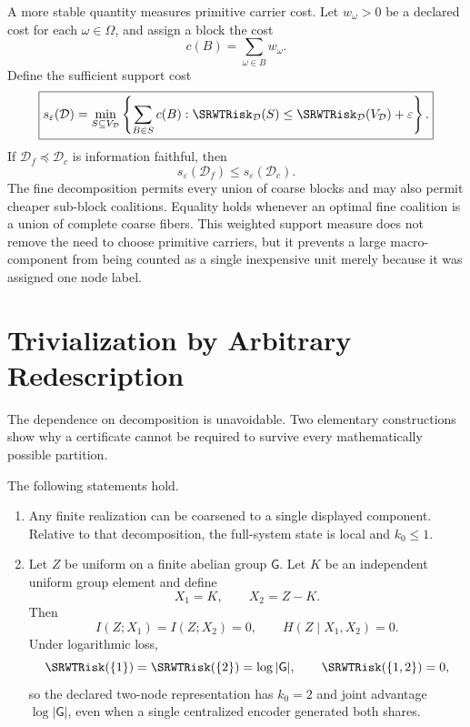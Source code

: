 A more stable quantity measures primitive carrier cost. Let
\(w_\omega>0\) be a declared cost for each \(\omega\in\Omega\), and assign a
block the cost
\[
c(B)=\sum_{\omega\in B}w_\omega.
\]
Define the sufficient support cost
\[
\boxed{
s_\varepsilon(\mathcal D)
=
\min_{S\subseteq V_{\mathcal D}}
\left\{
\sum_{B\in S}c(B):
\SRWTRisk_{\mathcal D}(S)
\leq
\SRWTRisk_{\mathcal D}(V_{\mathcal D})+\varepsilon
\right\}.
}
\]
If \(\mathcal D_f\preceq\mathcal D_c\) is information faithful, then
\[
\boxed{
s_\varepsilon(\mathcal D_f)
\leq
s_\varepsilon(\mathcal D_c).}
\]
The fine decomposition permits every union of coarse blocks and may also
permit cheaper sub-block coalitions. Equality holds whenever an optimal fine
coalition is a union of complete coarse fibers. This weighted support measure
does not remove the need to choose primitive carriers, but it prevents a
large macro-component from being counted as a single inexpensive unit merely
because it was assigned one node label.

\section{Trivialization by Arbitrary Redescription}

The dependence on decomposition is unavoidable. Two elementary constructions
show why a certificate cannot be required to survive every mathematically
possible partition.

\begin{SRWTproposition}
\label{SRWT:prop:decomposition-trivialization}
The following statements hold.
\begin{enumerate}
\item Any finite realization can be coarsened to a single displayed component.
 Relative to that decomposition, the full-system state is local and
 \(k_0\leq1\).
\item Let \(Z\) be uniform on a finite abelian group \(\mathsf G\). Let
 \(K\) be an independent uniform group element and define
 \[
 X_1=K,
 \qquad
 X_2=Z-K.
 \]
 Then
 \[
 I(Z;X_1)=I(Z;X_2)=0,
 \qquad
 H(Z\mid X_1,X_2)=0.
 \]
 Under logarithmic loss,
 \[
 \SRWTRisk(\{1\})=\SRWTRisk(\{2\})=\log|\mathsf G|,
 \qquad
 \SRWTRisk(\{1,2\})=0,
 \]
 so the declared two-node representation has \(k_0=2\) and joint advantage
 \(\log|\mathsf G|\), even when a single centralized encoder generated both
 shares.
\end{enumerate}
\end{SRWTproposition}

